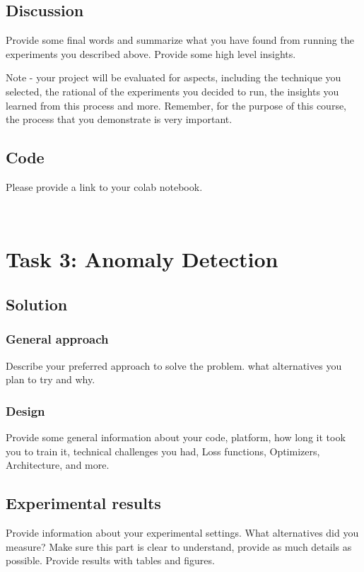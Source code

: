\documentclass{article}
\begin{document}
\subsection{Discussion}
Provide some final words and summarize what you have found from running the experiments you described above. Provide some high level insights.

Note - your project will be evaluated for aspects, including the technique you selected, the rational of the experiments you decided to run, the insights you learned from this process and more. Remember, for the purpose of this course, the process that you demonstrate is very  important.

\subsection{Code}

Please provide a link to your colab notebook.


\
\section{Task 3: Anomaly Detection}

\subsection{Solution}
\subsubsection{General approach}
Describe your preferred approach to solve the problem. what alternatives you plan to try and why. 

\subsubsection{Design}
Provide some general information about your code, platform, how long it took you to train it, technical challenges you had, Loss functions, Optimizers, Architecture, and more.

\subsection{Experimental results}
Provide information about your experimental settings. What alternatives did you measure? Make sure this part is clear to understand, provide as much details as possible. Provide results with tables and figures.
\end{document}
